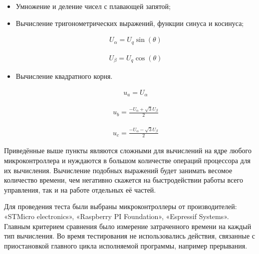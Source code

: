 \begin{itemize}
	\item Умножение и деление чисел с плавающей запятой;
	\item Вычисление тригонометрических выражений, функции синуса и косинуса;

	      \begin{ceqn}
		      \begin{align} \label{u_park}
			      U_\alpha = U_q \sin(\theta)
		      \end{align}
	      \end{ceqn}


	      \begin{ceqn}
		      \begin{align} \label{u_park2}
			      U_\beta = U_q \cos(\theta)
		      \end{align}
	      \end{ceqn}
	\item Вычисление квадратного корня.
	      \begin{ceqn}
		      \begin{align} \label{U_a}
			      u_a = U_\alpha
		      \end{align}
	      \end{ceqn}

	      \begin{ceqn}
		      \begin{align} \label{u_b}
			      u_b = \frac{-U_\alpha + \sqrt{3}U_\beta}{2}
		      \end{align}
	      \end{ceqn}

	      \begin{ceqn}
		      \begin{align} \label{u_c}
			      u_c = \frac{-U_\alpha - \sqrt{3}U_\beta}{2}
		      \end{align}
	      \end{ceqn}

\end{itemize}



Приведённые выше пункты являются сложными для вычислений на ядре любого микроконтроллера и нуждаются в большом количестве операций процессора для их вычисления.  Вычисление подобных выражений будет занимать весомое количество времени, чем негативно скажется на быстродействии работы всего управления, так и на работе отдельных её частей\citep{pack2008microcontroller}.


Для проведения теста были выбраны микроконтроллеры от производителей: «STMicro electronics», «Raspberry PI Foundation», «Espressif Systems».
Главным критерием сравнения было измерение затраченного времени на каждый тип вычисления. Во время тестирования не использовались действия, связанные с приостановкой главного цикла исполняемой программы, например прерывания.

